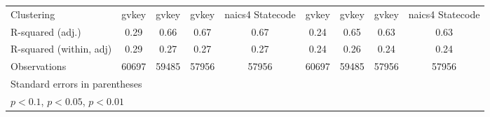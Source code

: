 {\begin{tabular}{l*{8}{c}}
\midrule
Clustering          &       gvkey         &       gvkey         &       gvkey         &naics4 Statecode         &       gvkey         &       gvkey         &       gvkey         &naics4 Statecode         \\
R-squared (adj.)    &        0.29         &        0.66         &        0.67         &        0.67         &        0.24         &        0.65         &        0.63         &        0.63         \\
R-squared (within, adj)&        0.29         &        0.27         &        0.27         &        0.27         &        0.24         &        0.26         &        0.24         &        0.24         \\
Observations        &       60697         &       59485         &       57956         &       57956         &       60697         &       59485         &       57956         &       57956         \\
\bottomrule
\multicolumn{9}{l}{\tiny Standard errors in parentheses}\\
\multicolumn{9}{l}{\tiny \sym{*} \(p<0.1\), \sym{**} \(p<0.05\), \sym{***} \(p<0.01\)}\\
\end{tabular}
}
